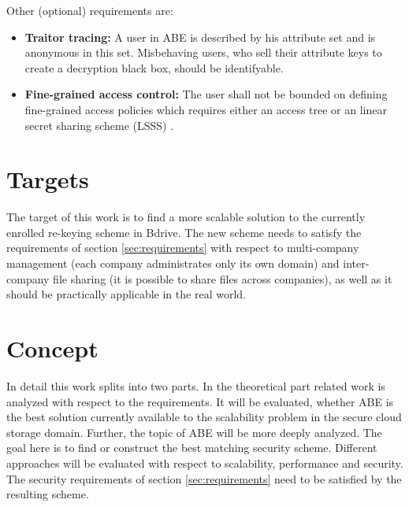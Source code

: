 \documentclass[twocolumn]{article}
\begin{document}
\noindent Other (optional) requirements are: 
\begin{itemize}
	\item \textbf{Traitor tracing:} A user in ABE is described by his attribute set and is anonymous in this set. Misbehaving users, who sell their attribute keys to create a decryption black box, should be identifyable. \cite{liu2016practical}
	\item \textbf{Fine-grained access control:} The user shall not be bounded on defining fine-grained access policies which requires either an access tree \cite{bethencourt2007ciphertext} or an linear secret sharing scheme (LSSS) \cite{yang2013dac} \cite{li2016secure} \cite{wu2017security} \cite{li2013matrix} \cite{liu2016practical}.
\end{itemize}

\section{Targets}
The target of this work is to find a more scalable solution to the currently enrolled re-keying scheme in Bdrive. The new scheme needs to satisfy the requirements of section \ref{sec:requirements} with respect to multi-company management (each company administrates only its own domain) and inter-company file sharing (it is possible to share files across companies), as well as it should be practically applicable in the real world.

 
\section{Concept}
In detail this work splits into two parts. In the theoretical part related work is analyzed with respect to the requirements. It will be evaluated, whether ABE is the best solution currently available to the scalability problem in the secure cloud storage domain. Further, the topic of ABE will be more deeply analyzed. The goal here is to find or construct the best matching security scheme. Different approaches will be evaluated with respect to scalability, performance and security. The security requirements of section \ref{sec:requirements} need to be satisfied by the resulting scheme.\\ %
\end{document}
